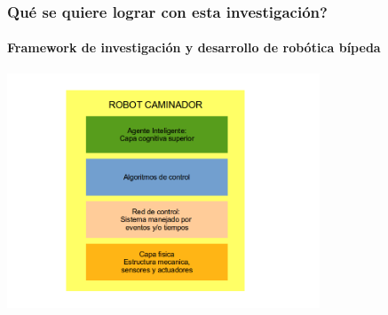 \mode*
\begin{frame}[label=objgen]
  \objgenTime
  \frametitle{Qu\'e se quiere lograr con esta investigaci\'on?}
  \framesubtitle{Framework de investigaci\'on y desarrollo de rob\'otica b\'ipeda}
  \begin{center}
    \includegraphics[height=7.0cm]{../images/objGen.png}
  \end{center}
\end{frame}
